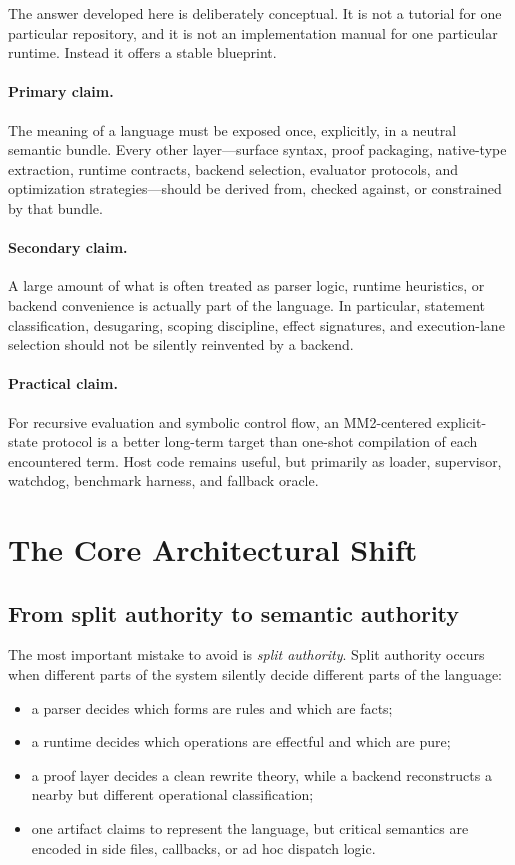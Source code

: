 \documentclass[11pt]{article}
\begin{document}
The answer developed here is deliberately conceptual. It is not a tutorial for one particular repository, and it is not an implementation manual for one particular runtime. Instead it offers a stable blueprint.

\paragraph{Primary claim.}
The meaning of a language must be exposed once, explicitly, in a neutral semantic bundle. Every other layer---surface syntax, proof packaging, native-type extraction, runtime contracts, backend selection, evaluator protocols, and optimization strategies---should be derived from, checked against, or constrained by that bundle.

\paragraph{Secondary claim.}
A large amount of what is often treated as parser logic, runtime heuristics, or backend convenience is actually part of the language. In particular, statement classification, desugaring, scoping discipline, effect signatures, and execution-lane selection should not be silently reinvented by a backend.

\paragraph{Practical claim.}
For recursive evaluation and symbolic control flow, an MM2-centered explicit-state protocol is a better long-term target than one-shot compilation of each encountered term. Host code remains useful, but primarily as loader, supervisor, watchdog, benchmark harness, and fallback oracle.

\section{The Core Architectural Shift}

\subsection{From split authority to semantic authority}

The most important mistake to avoid is \emph{split authority}. Split authority occurs when different parts of the system silently decide different parts of the language:
\begin{itemize}[leftmargin=2em]
  \item a parser decides which forms are rules and which are facts;
  \item a runtime decides which operations are effectful and which are pure;
  \item a proof layer decides a clean rewrite theory, while a backend reconstructs a nearby but different operational classification;
  \item one artifact claims to represent the language, but critical semantics are encoded in side files, callbacks, or ad hoc dispatch logic.
\end{itemize}
\end{document}
